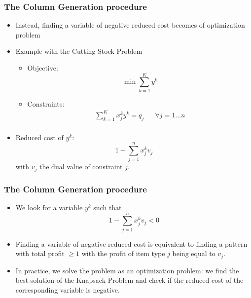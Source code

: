 \documentclass[10pt]{beamer}
\begin{document}
\begin{frame}
  \frametitle{The Column Generation procedure}
  \begin{itemize}
    \item Instead, finding a variable of negative reduced cost becomes of optimization problem

    \item Example with the Cutting Stock Problem
      \begin{itemize}
        \item Objective:
          \begin{displaymath}
            \min \sum_{k = 1}^{K} y^k
          \end{displaymath}

        \item Constraints:
          \begin{align*}
            \sum_{k = 1}^{K} x_j^k y^k = q_j && \forall j = 1 \dots n \\
          \end{align*}
      \end{itemize}

    \item Reduced cost of $y^k$:
      \begin{displaymath}
        1 - \sum_{j = 1}^n x_j^k v_j
      \end{displaymath}
      with $v_j$ the dual value of constraint $j$.
  \end{itemize}
\end{frame}

\begin{frame}
  \frametitle{The Column Generation procedure}
  
  \begin{itemize}
    \item We look for a variable $y^k$ such that
      \begin{displaymath}
        1 - \sum_{j = 1}^n x_j^k v_j < 0
      \end{displaymath}
    
    \item Finding a variable of negative reduced cost is equivalent to finding a pattern with total profit $\ge 1$ with the profit of item type $j$ being equal to $v_j$.

    \item In practice, we solve the problem as an optimization problem: we find the best solution of the Knapsack Problem and check if the reduced cost of the corresponding variable is negative.
  \end{itemize}

\end{frame}
\end{document}
